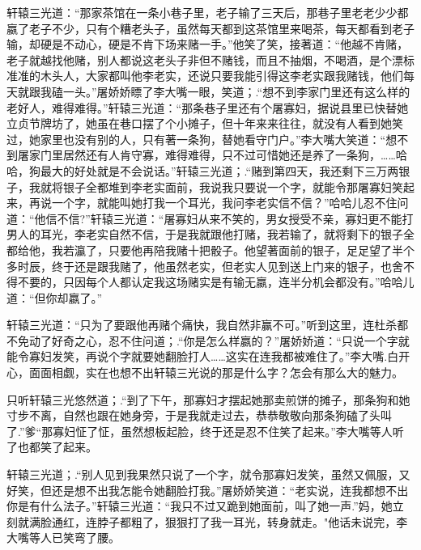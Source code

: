 \documentclass[12pt,oneside]{book}
\begin{document}
轩辕三光道：``那家茶馆在一条小巷子里，老子输了三天后，那巷子里老老少少都嬴了老子不少，只有个糟老头子，虽然每天都到这茶馆里来喝茶，每天都看到老子输，却硬是不动心，硬是不肯下场来赌一手。''他笑了笑，接著道：``他越不肯赌，老子就越找他赌，别人都说这老头子非但不赌钱，而且不抽烟，不喝酒，是个漂标准准的木头人，大家都叫他李老实，还说只要我能引得这李老实跟我赌钱，他们每天就跟我磕一头。''屠娇娇瞟了李大嘴一眼，笑道；.``想不到李家门里还有这么样的老好人，难得难得。''轩辕三光道：``那条巷子里还有个屠寡妇，据说县里已快替她立贞节牌坊了，她虽在巷口摆了个小摊子，但十年来来往往，就没有人看到她笑过，她家里也没有别的人，只有著一条狗，替她看守门户。''李大嘴大笑道：``想不到屠家门里居然还有人肯守寡，难得难得，只不过可惜她还是养了一条狗，\ldots\ldots 哈哈，狗最大的好处就是不会说话。''轩辕三光道；.``赌到第四天，我还剩下三万两银子，我就将银子全都堆到李老实面前，我说我只要说一个字，就能令那屠寡妇笑起来，再说一个字，就能叫她打我一个耳光，我问李老实信不信？''哈哈儿忍不住问道：``他信不信?''轩辕三光道：``屠寡妇从来不笑的，男女授受不亲，寡妇更不能打男人的耳光，李老实自然不信，于是我就跟他打赌，我若输了，就将剩下的银子全都给他，我若瀛了，只要他再陪我赌十把骰子。他望著面前的银子，足足望了半个多时辰，终于还是跟我赌了，他虽然老实，但老实人见到送上门来的银子，也舍不得不要的，只因每个人都认定我这场赌实是有输无嬴，连半分机会都没有。''哈哈儿道：``但你却嬴了。''

轩辕三光道：``只为了要跟他再赌个痛快，我自然非赢不可。''听到这里，连杜杀都不免动了好奇之心，忍不住问道；.``你是怎么样嬴的？''屠娇娇道：``只说一个字就能令寡妇发笑，再说个字就要她翻脸打人\ldots\ldots 这实在连我都被难住了。''李大嘴.白开心，面面相觑，实在也想不出轩辕三光说的那是什么字？怎会有那么大的魅力。

只听轩辕三光悠然道；.``到了下午，那寡妇才摆起她那卖煎饼的摊子，那条狗和她寸步不离，自然也跟在她身旁，于是我就走过去，恭恭敬敬向那条狗磕了头叫了.''爹``那寡妇怔了怔，虽然想板起脸，终于还是忍不住笑了起来。''李大嘴等人听了也都笑了起来。

轩辕三光道；.``别人见到我果然只说了一个字，就令那寡妇发笑，虽然又佩服，又好笑，但还是想不出我怎能令她翻脸打我。''屠娇娇笑道：``老实说，连我都想不出你是有什么法子。''轩辕三光道：``我只不过又跪到她面前，叫了她一声.''妈，她立刻就满脸通红，连脖子都粗了，狠狠打了我一耳光，转身就走。"他话未说完，李大嘴等人已笑弯了腰。
\end{document}
